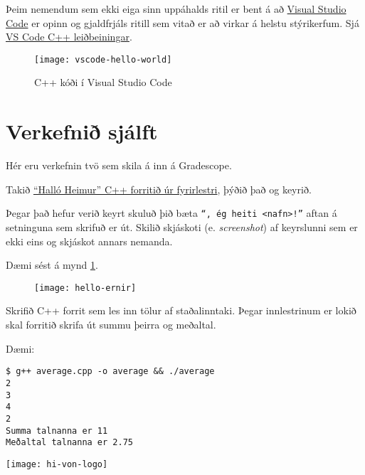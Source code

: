 \documentclass{article}
\begin{document}
Þeim nemendum sem ekki eiga sinn uppáhalds ritil er bent á að \href{https://code.visualstudio.com/}{Visual Studio Code} er opinn og gjaldfrjáls ritill sem vitað er að virkar á helstu stýrikerfum. Sjá \href{https://code.visualstudio.com/docs/languages/cpp}{VS Code C++ leiðbeiningar}.

\begin{figure}[hb]
    \caption{C++ kóði í Visual Studio Code}
    \begin{center}
        \texttt{[image: vscode-hello-world]}
    \end{center}
\end{figure}

\newpage

\section{Verkefnið sjálft}

Hér eru verkefnin tvö sem skila á inn á Gradescope.

\question

Takið \href{https://raw.githubusercontent.com/Ernir/kennsluefni/master/T2/Code/w1/hello.cpp}{``Halló Heimur'' C++ forritið úr fyrirlestri}, þýðið það og keyrið.

Þegar það hefur verið keyrt skuluð þið bæta \texttt{``, ég heiti <nafn>!''} aftan á setninguna sem skrifuð er út. Skilið skjáskoti (e. \emph{screenshot}) af keyrslunni sem er ekki eins og skjáskot annars nemanda.

Dæmi sést á mynd \ref{hello-ernir}.
\begin{figure}[h!]
    \label{hello-ernir}
    \begin{center}
        \texttt{[image: hello-ernir]}
    \end{center}
\end{figure}

\question

Skrifið C++ forrit sem les inn tölur af staðalinntaki. Þegar innlestrinum er lokið skal forritið skrifa út summu þeirra og meðaltal.

Dæmi:
\begin{verbatim}
$ g++ average.cpp -o average && ./average
2
3
4
2
Summa talnanna er 11
Meðaltal talnanna er 2.75    
\end{verbatim}

\vfill
\texttt{[image: hi-von-logo]}
\end{document}
